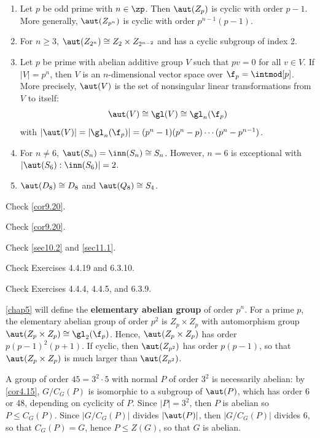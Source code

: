  \label{prop4.17}

\begin{enumerate}
    \item Let $p$ be odd prime with $n \in \zp$. Then $\aut(Z_p)$ is cyclic with order $p - 1$. More generally, $\aut(Z_{p^n})$ is cyclic with order $p^{n - 1}(p - 1)$.
    \item For $n \geq 3$, $\aut(Z_{2^n}) \cong Z_2 \times Z_{2^{n - 2}}$ and has a cyclic subgroup of index 2.
    \item Let $p$ be prime with abelian additive group $V$ such that $pv = 0$ for all $v \in V$. If $|V| = p^n$, then $V$ is an $n$-dimensional vector space over $\f_p = \intmod[p]$. More precisely, $\aut(V)$ is the set of nonsingular linear transformations from $V$ to itself:
    \[\aut(V) \cong \gl(V) \cong \gl_n(\f_p)\]
    with $|\aut(V)| = |\gl_n(\f_p)| = (p^n - 1)(p^n - p) \cdots (p^n - p^{n - 1})$.
    \item For $n \neq 6$, $\aut(S_n) = \inn(S_n) \cong S_n$. However, $n = 6$ is exceptional with $|\aut(S_6) : \inn(S_6)| = 2$.
    \item $\aut(D_8) \cong D_8$ and $\aut(Q_8) \cong S_4$.
\end{enumerate}

\begin{proofnum}
    \item Check \autoref{cor9.20}.
    \item Check \autoref{cor9.20}.
    \item Check \autoref{sec10.2} and \autoref{sec11.1}.
    \item Check Exercises 4.4.19 and 6.3.10.
    \item Check Exercises 4.4.4, 4.4.5, and 6.3.9.
\end{proofnum}

\ex \autoref{chap5} will define the \textbf{elementary abelian group} of order $p^n$. For a prime $p$, the elementary abelian group of order $p^2$ is $Z_p \times Z_p$ with automorphism group $\aut(Z_p \times Z_p) \cong \gl_2(\f_p)$. Hence, $\aut(Z_p \times Z_p)$ has order $p(p - 1)^2(p + 1)$. If cyclic, then $\aut(Z_{p^2})$ has order $p(p - 1)$, so that $\aut(Z_p \times Z_p)$ is much larger than $\aut(Z_{p^2})$.

\ex A group of order $45 = 3^2 \cdot 5$ with normal $P$ of order $3^2$ is necessarily abelian: by \autoref{cor4.15}, $G/C_G(P)$ is isomorphic to a subgroup of $\aut(P)$, which has order 6 or 48, depending on cyclicity of $P$. Since $|P| = 3^2$, then $P$ is abelian so $P \leq C_G(P)$. Since $|G/C_G(P)|$ divides $|\aut(P)|$, then $|G/C_G(P)|$ divides 6, so that $C_G(P) = G$, hence $P \leq Z(G)$, so that $G$ is abelian.

